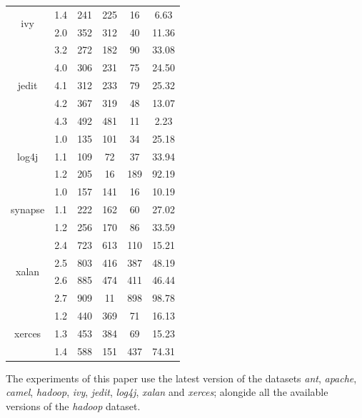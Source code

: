 \begin{center}
\begin{longtable}{ | c | c | c c c c | }
\hline
\multirow{2}{*}{ivy} &   
    1.4 &   241 &   225 &    16 &    6.63 \\
&   2.0 &   352 &   312 &    40 &   11.36 \\

\hline
\multirow{5}{*}{jedit} & 
    3.2 &   272 &   182 &    90 &   33.08 \\
&   4.0 &   306 &   231 &    75 &   24.50 \\
&   4.1 &   312 &   233 &    79 &   25.32 \\
&   4.2 &   367 &   319 &    48 &   13.07 \\
&   4.3 &   492 &   481 &    11 &    2.23 \\

\hline
\multirow{3}{*}{log4j} & 
    1.0 &   135 &   101 &    34 &   25.18 \\
&   1.1 &   109 &    72 &    37 &   33.94 \\
&   1.2 &   205 &    16 &   189 &   92.19 \\

\hline
\multirow{3}{*}{synapse} &
    1.0 &   157 &   141 &    16 &   10.19 \\
&   1.1 &   222 &   162 &    60 &   27.02 \\
&   1.2 &   256 &   170 &    86 &   33.59 \\

\hline
\multirow{4}{*}{xalan} & 
    2.4 &   723 &   613 &   110 &   15.21 \\
&   2.5 &   803 &   416 &   387 &   48.19 \\
&   2.6 &   885 &   474 &   411 &   46.44 \\
&   2.7 &   909 &    11 &   898 &   98.78 \\

\hline
\multirow{3}{*}{xerces} &
    1.2 &   440 &   369 &    71 &   16.13 \\
&   1.3 &   453 &   384 &    69 &   15.23 \\
&   1.4 &   588 &   151 &   437 &   74.31 \\
\hline

\end{longtable}
\end{center}

The experiments of this paper use the latest version of the datasets 
\textit{ant}, \textit{apache}, \textit{camel}, \textit{hadoop}, \textit{ivy},
\textit{jedit}, \textit{log4j}, \textit{xalan} and \textit{xerces}; alongide
all the available versions of the \textit{hadoop} dataset.

